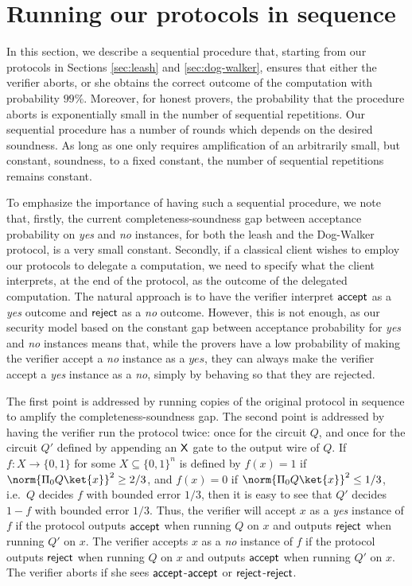 \section{Running our protocols in sequence}
\label{sec:sequential}


In this section, we describe a sequential procedure that, starting from our protocols in Sections \ref{sec:leash} and \ref{sec:dog-walker}, ensures that either the verifier aborts, or she obtains the correct outcome of the computation with probability $99\%$. Moreover, for honest provers, the probability that the procedure aborts is exponentially small in the number of sequential repetitions. Our sequential procedure has a number of rounds which depends on the desired soundness. As long as one only requires amplification of an arbitrarily small, but constant, soundness, to a fixed constant, the number of sequential repetitions remains constant.

To emphasize the importance of having such a sequential procedure, we note that, firstly, the current completeness-soundness gap between acceptance probability on \textit{yes} and \textit{no} instances, for both the leash and the Dog-Walker protocol, is a very small constant. Secondly, if a classical client wishes to employ our protocols to delegate a computation, we need to specify what the client interprets, at the end of the protocol, as the outcome of the delegated computation. The natural approach is to have the verifier interpret $\sf accept$ as a \textit{yes} outcome and $\sf reject$ as a \textit{no} outcome. However, this is not enough, as our security model based on the constant gap between acceptance probability for \textit{yes} and \textit{no} instances means that, while the provers have a low probability of making the verifier accept a \textit{no} instance as a $\textit{yes}$, they can always make the verifier accept a \textit{yes} instance as a \textit{no}, simply by behaving so that they are rejected.

The first point is addressed by running copies of the original protocol in sequence to amplify the completeness-soundness gap. The second point is addressed by having the verifier run the protocol twice: once for the circuit $Q$, and once for the circuit $Q'$ defined by appending an $\sf X$ gate to the output wire of $Q$. If $f:X\rightarrow \{0,1\}$ for some $X\subseteq \{0,1\}^n$ is defined by $f(x)=1$ if $\norm{\Pi_0 Q\ket{x}}^2\geq 2/3$, and $f(x)=0$ if $\norm{\Pi_0 Q\ket{x}}^2\leq 1/3$, i.e.\ $Q$ decides $f$ with bounded error $1/3$, then it is easy to see that $Q'$ decides $1-f$ with bounded error $1/3$. Thus, the verifier will accept $x$ as a \textit{yes} instance of $f$ if the protocol outputs ${\sf accept}$ when running $Q$ on $x$ and outputs $\sf reject$ when running $Q'$ on $x$. The verifier accepts $x$ as a \textit{no} instance of $f$ if the protocol outputs $\sf reject$ when running $Q$ on $x$ and outputs $\sf accept$ when running $Q'$ on $x$. The verifier aborts if she sees $\sf accept$-$\sf accept$ or $\sf reject$-$\sf reject$. 



